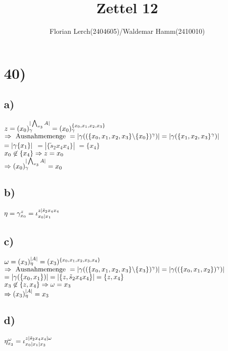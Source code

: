 \documentclass[11pt]{amsart}
\title{Zettel 12 }
\author{Florian Lerch(2404605)/Waldemar Hamm(2410010)}
\begin{document}
\maketitle

\section*{40)}
\subsection*{a)}
$z = (x_0)_{\gamma}^{|\bigwedge_{x_3}A|} = (x_0)_{\gamma}^{\{x_0,x_1,x_2,x_3\}}$ \\ %
$\Rightarrow \mbox{ Ausnahmemenge } = |\gamma((\{x_0,x_1,x_2,x_3\} \backslash \{x_0\})^{\gamma})| = |\gamma(\{x_1,x_2,x_3\}^{\gamma})|$ \\
$= |\gamma\{x_1\}|$ %
$= |\{\tilde s_2x_4x_4\}|$ %
$= \{x_4\}$ \\
$x_0 \not \in \{x_4\} \Rightarrow z = x_0$ \\
$\Rightarrow (x_0)_{\gamma}^{|\bigwedge_{x_3}A|} = x_0$
\subsection*{b)}
$\eta = \gamma^z_{x_0} = \iota_{x_0|x_1}^{z|\tilde s_2 x_4x_4}$ %
\subsection*{c)}
$\omega = (x_3)^{|A|}_{\eta} = (x_3)^{\{x_0,x_1,x_2,x_3,x_4\}}$
$\Rightarrow \mbox{ Ausnahmemenge } = |\gamma((\{x_0,x_1,x_2,x_3\} \backslash \{x_3\})^{\gamma})| = |\gamma((\{x_0,x_1,x_2\})^{\gamma})|$ \\
$= |\gamma(\{x_0,x_1\})| = |\{z, \tilde s_2 x_4 x_4\}| = \{z,x_4\}$ \\
$x_3 \not \in \{z,x_4\} \Rightarrow \omega = x_3$ \\
$\Rightarrow (x_3)^{|A|}_{\eta} = x_3$
\subsection*{d)}
$\eta_{x_3}^{\omega} = \iota_{x_0|x_1|x_3}^{z|\tilde s_2x_4 x_4|\omega}$ \\
\end{document}

